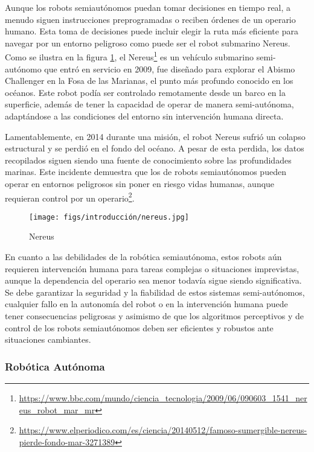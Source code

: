 Aunque los robots semiautónomos puedan tomar decisiones en tiempo real, a menudo siguen instrucciones preprogramadas o reciben órdenes de un operario humano. Esta toma de decisiones
puede incluir elegir la ruta más eficiente para navegar por un entorno peligroso como puede ser el robot submarino Nereus. Como se ilustra en la figura \ref{fig:Nereus}, 
el Nereus\footnote{\url{https://www.bbc.com/mundo/ciencia_tecnologia/2009/06/090603_1541_nereus_robot_mar_mr}} 
es un vehículo submarino semi-autónomo que entró en servicio en 2009, fue diseñado para explorar el Abismo Challenger en la Fosa de las Marianas, el punto más profundo conocido en los 
océanos. Este robot podía ser controlado remotamente desde un barco en la superficie, además de tener la capacidad de operar de manera semi-autónoma, adaptándose a las condiciones del entorno
sin intervención humana directa.

Lamentablemente, en 2014 durante una misión, el robot Nereus sufrió un colapso estructural y se perdió en el fondo del océano. A pesar de esta perdida, los datos recopilados
siguen siendo una fuente de conocimiento sobre las profundidades marinas. Este incidente demuestra que los de robots semiautónomos pueden operar en entornos peligrosos sin poner 
en riesgo vidas humanas, aunque requieran control por un operario\footnote{\url{https://www.elperiodico.com/es/ciencia/20140512/famoso-sumergible-nereus-pierde-fondo-mar-3271389}}. 

\begin{figure} [H]
  \begin{center}
    \texttt{[image: figs/introducción/nereus.jpg]}
  \end{center}
  \caption{Nereus}
  \label{fig:Nereus}
  \vspace{-1.5em}
\end{figure}

En cuanto a las debilidades de la robótica semiautónoma, estos robots 
aún requieren intervención humana para tareas complejas o situaciones imprevistas, aunque la dependencia del operario sea menor todavía sigue siendo significativa. 
Se debe garantizar la seguridad y la fiabilidad de estos sistemas semi-autónomos, cualquier fallo en la autonomía del robot 
o en la intervención humana puede tener consecuencias peligrosas y asimismo de que los algoritmos perceptivos y de control de los robots semiautónomos deben ser eficientes y 
robustos ante situaciones cambiantes.

\subsubsection{Robótica Autónoma}
\label{sec:subseccion}

